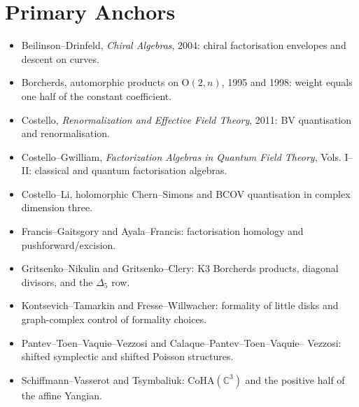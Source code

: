 \documentclass[11pt]{article}
\providecommand{\bC}{\mathbb{C}}
\providecommand{\CoHA}{\mathrm{CoHA}}
\begin{document}
\section{Primary Anchors}

\begin{itemize}[leftmargin=1.4em]
\item Beilinson--Drinfeld, \emph{Chiral Algebras}, 2004: chiral
factorisation envelopes and descent on curves.
\item Borcherds, automorphic products on $\mathrm{O}(2,n)$, 1995 and
1998: weight equals one half of the constant coefficient.
\item Costello, \emph{Renormalization and Effective Field Theory}, 2011:
BV quantisation and renormalisation.
\item Costello--Gwilliam, \emph{Factorization Algebras in Quantum Field
Theory}, Vols. I--II: classical and quantum factorisation algebras.
\item Costello--Li, holomorphic Chern--Simons and BCOV quantisation in
complex dimension three.
\item Francis--Gaitsgory and Ayala--Francis: factorisation homology and
pushforward/excision.
\item Gritsenko--Nikulin and Gritsenko--Clery: K3 Borcherds products,
diagonal divisors, and the $\Delta_5$ row.
\item Kontsevich--Tamarkin and Fresse--Willwacher: formality of little
disks and graph-complex control of formality choices.
\item Pantev--Toen--Vaquie--Vezzosi and Calaque--Pantev--Toen--Vaquie--
Vezzosi: shifted symplectic and shifted Poisson structures.
\item Schiffmann--Vasserot and Tsymbaliuk: $\CoHA(\bC^3)$ and the
positive half of the affine Yangian.
\end{itemize}
\end{document}
